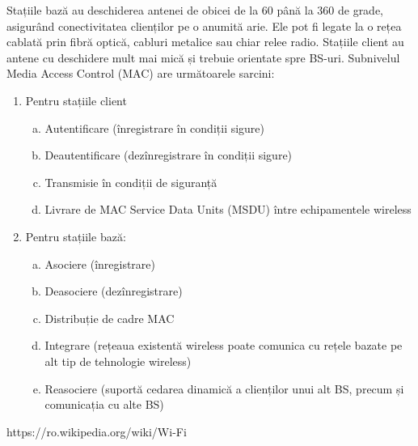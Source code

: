 \documentclass{article}
\begin{document}
Stațiile bază au deschiderea antenei de obicei de la 60 până la 360 de grade, asigurând conectivitatea clienților pe o anumită arie. Ele pot fi legate la o rețea cablată prin fibră optică, cabluri metalice sau chiar relee radio. Stațiile client au antene cu deschidere mult mai mică și trebuie orientate spre BS-uri. Subnivelul Media Access Control (MAC) are următoarele sarcini:
\begin{enumerate}
\item Pentru stațiile client
\begin{enumerate}[a)]
\item Autentificare (înregistrare în condiții sigure)
\item Deautentificare (dezînregistrare în condiții sigure)
\item Transmisie în condiții de siguranță
\item Livrare de MAC Service Data Units (MSDU) între echipamentele wireless
\end{enumerate}
\item Pentru stațiile bază:
\begin{enumerate}[a)]
\item Asociere (înregistrare)
\item Deasociere (dezînregistrare)
\item Distribuție de cadre MAC
\item Integrare (rețeaua existentă wireless poate comunica cu rețele bazate pe alt tip de tehnologie wireless)
\item Reasociere (suportă cedarea dinamică a clienților unui alt BS, precum și comunicația cu alte BS)
\end{enumerate}
\end{enumerate}

\begin{thebibliography}{99}
\bibitem{} https://ro.wikipedia.org/wiki/Wi-Fi
\end{thebibliography}
\end{document}
